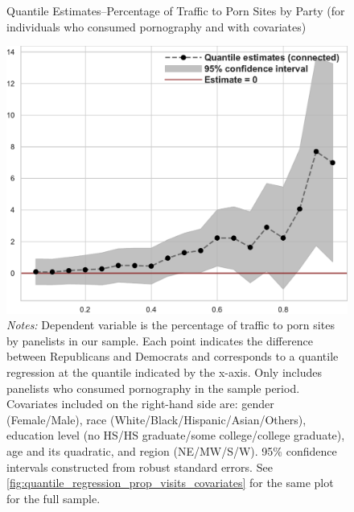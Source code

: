 \documentclass[12pt, letterpaper]{article}
\begin{document}
\begin{figure}
	\centering
	\caption{Quantile Estimates--Percentage of Traffic to Porn Sites by Party (for individuals who consumed pornography and with covariates)}
	\includegraphics[width=.55\linewidth]{../figs/quantile_reg_nonzero_covariates_proportion_visits_adult.pdf}
	\caption*{\footnotesize \emph{Notes:} 
		Dependent variable is the percentage of traffic to porn sites by panelists in our sample.
		Each point indicates the difference between Republicans and Democrats and corresponds to a quantile regression at the quantile indicated by the x-axis.
		Only includes panelists who consumed pornography in the sample period.
		Covariates included on the right-hand side are: gender (Female/Male), race (White/Black/Hispanic/Asian/Others), education level (no HS/HS graduate/some college/college graduate), age and its quadratic, and region (NE/MW/S/W).
		95\% confidence intervals constructed from robust standard errors.
		See \cref{fig:quantile_regression_prop_visits_covariates} for the same plot for the full sample.
	}
	\label{fig:quantile_regression_prop_visits_nonzeroes_covariates}
\end{figure}
\end{document}
